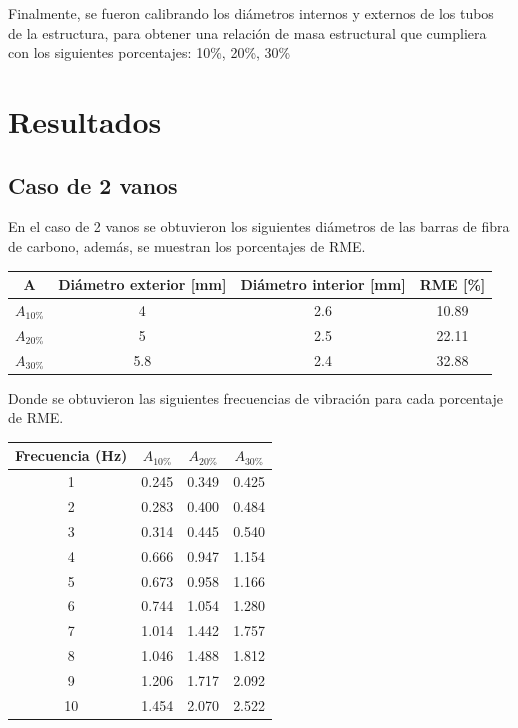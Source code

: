Finalmente, se fueron calibrando los diámetros internos y externos de los tubos de la estructura, para obtener una relación de masa estructural que cumpliera con los siguientes porcentajes: 10\%, 20\%, 30\%

\section{Resultados}


\subsection{Caso de 2 vanos}
En el caso de 2 vanos se obtuvieron los siguientes diámetros de las barras de fibra de carbono, además, se muestran los porcentajes de RME.

\begin{table}[H]
    \centering
    \begin{tabular}{cccc}
    \toprule
     A & Diámetro exterior [mm] & Diámetro interior [mm] & RME [\%] \\
    \midrule
     $A_{10\%}$ &  4 &  2.6 &  10.89 \\
     $A_{20\%}$ &  5 &  2.5 &  22.11 \\
     $A_{30\%}$ &  5.8 &  2.4 &  32.88 \\
    \bottomrule
    \end{tabular}
\end{table}

Donde se obtuvieron las siguientes frecuencias de vibración para cada porcentaje de RME.

\begin{table}[H]
    \centering
    \begin{tabular}{cccc}
    \toprule
     Frecuencia (Hz) & $A_{10\%}$ & $A_{20\%}$ & $A_{30\%}$ \\
    \midrule
     1 &  0.245 &  0.349 &  0.425 \\
     2 &  0.283 &  0.400 &  0.484 \\
     3 &  0.314 &  0.445 &  0.540 \\
     4 &  0.666 &  0.947 &  1.154 \\
     5 &  0.673 &  0.958 &  1.166 \\
     6 &  0.744 &  1.054 &  1.280 \\
     7 &  1.014 &  1.442 &  1.757 \\
     8 &  1.046 &  1.488 &  1.812 \\
     9 &  1.206 &  1.717 &  2.092 \\
     10 &  1.454 &  2.070 &  2.522 \\
    \bottomrule
    \end{tabular}
\end{table}

